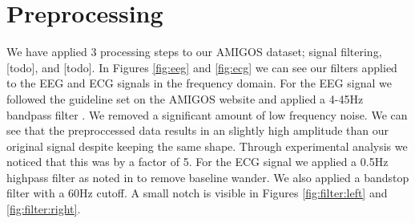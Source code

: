
\FloatBarrier
\section{Preprocessing}
We have applied 3 processing steps to our AMIGOS dataset;
signal filtering, [todo], and [todo].
In Figures \ref{fig:eeg} and \ref{fig:ecg}
we can see our filters applied to the EEG and ECG signals in the frequency domain.
For the EEG signal we followed the guideline set on the AMIGOS
website and applied a 4-45Hz bandpass filter \cite{AMIGOS:2018}.
We removed a significant amount of low frequency noise.
We can see that the preproccessed data results
in an slightly high amplitude than our original signal despite keeping the same shape.
Through experimental analysis we noticed that this was by a factor of 5.
For the ECG signal we applied a 0.5Hz highpass filter as noted in
\cite{SantamariaGranados:2019}
to remove baseline wander.
We also applied a bandstop filter with a 60Hz cutoff.
A small notch is visible in
Figures \ref{fig:filter:left} and \ref{fig:filter:right}.


\clearpage
